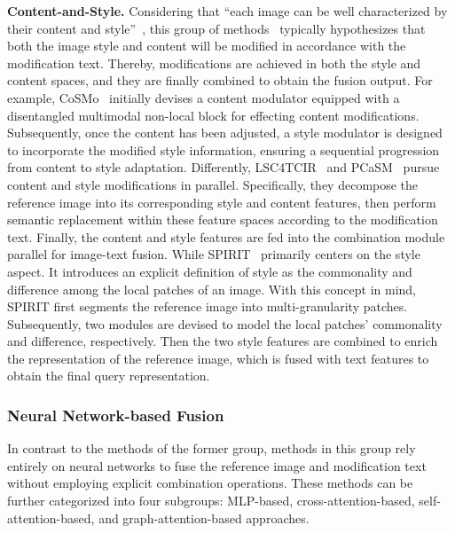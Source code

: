 \textbf{Content-and-Style.} Considering that ``each image can be well characterized by their content and style''~\cite{chawla2021lsc4cir}, this group of methods~\cite{lee2021cosmo, chawla2021lsc4cir, zhang2023pcasm, chen2024spirit} typically hypothesizes that both the image style and content will be modified in accordance with the modification text. Thereby, modifications are achieved in both the style and content spaces, and they are finally combined to obtain the fusion output. For example, CoSMo~\cite{lee2021cosmo} initially devises a content modulator equipped with a disentangled multimodal non-local block for effecting content modifications. Subsequently, once the content has been adjusted, a style modulator is designed to incorporate the modified style information, ensuring a sequential progression from content to style adaptation.
Differently, LSC4TCIR~\cite{chawla2021lsc4cir} and PCaSM~\cite{zhang2023pcasm} pursue content and style modifications in parallel. Specifically, they decompose the reference image into its corresponding style and content features, then perform semantic replacement within these feature spaces according to the modification text. Finally, the content and style features are fed into the combination module parallel for image-text fusion. 
While SPIRIT~\cite{chen2024spirit} primarily centers on the style aspect. It introduces an explicit definition of style as the commonality and difference among the local patches of an image. With this concept in mind, SPIRIT first segments the reference image into multi-granularity patches. Subsequently, two modules are devised to model the local patches' commonality and difference, respectively. Then the two style features are combined to enrich the representation of the reference image, which is fused with text features to obtain the final query
representation. 

\subsubsection{Neural Network-based Fusion}
In contrast to the methods of the former group, methods in this group rely entirely on neural networks to fuse the reference image and modification text without employing explicit combination operations. These methods can be further categorized into four subgroups: MLP-based, cross-attention-based, self-attention-based, and graph-attention-based approaches.

